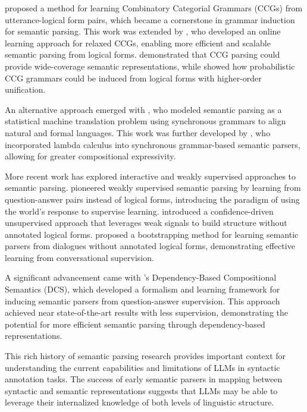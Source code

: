 \citet{zettlemoyer2005} proposed a method for learning Combinatory Categorial Grammars (CCGs) from utterance-logical form pairs, which became a cornerstone in grammar induction for semantic parsing. This work was extended by \citet{zettlemoyer2007online}, who developed an online learning approach for relaxed CCGs, enabling more efficient and scalable semantic parsing from logical forms. \citet{bos2004} demonstrated that CCG parsing could provide wide-coverage semantic representations, while \citet{kwiatkowski2010} showed how probabilistic CCG grammars could be induced from logical forms with higher-order unification.

An alternative approach emerged with \citet{wong2006learning}, who modeled semantic parsing as a statistical machine translation problem using synchronous grammars to align natural and formal languages. This work was further developed by \citet{wong2007}, who incorporated lambda calculus into synchronous grammar-based semantic parsers, allowing for greater compositional expressivity.

More recent work has explored interactive and weakly supervised approaches to semantic parsing. \citet{clarke2010} pioneered weakly supervised semantic parsing by learning from question-answer pairs instead of logical forms, introducing the paradigm of using the world's response to supervise learning. \citet{goldwasser2011confidence} introduced a confidence-driven unsupervised approach that leverages weak signals to build structure without annotated logical forms. \citet{artzi2011} proposed a bootstrapping method for learning semantic parsers from dialogues without annotated logical forms, demonstrating effective learning from conversational supervision.

A significant advancement came with \citet{liang2013learning}'s Dependency-Based Compositional Semantics (DCS), which developed a formalism and learning framework for inducing semantic parsers from question-answer supervision. This approach achieved near state-of-the-art results with less supervision, demonstrating the potential for more efficient semantic parsing through dependency-based representations.

This rich history of semantic parsing research provides important context for understanding the current capabilities and limitations of LLMs in syntactic annotation tasks. The success of early semantic parsers in mapping between syntactic and semantic representations suggests that LLMs may be able to leverage their internalized knowledge of both levels of linguistic structure.

